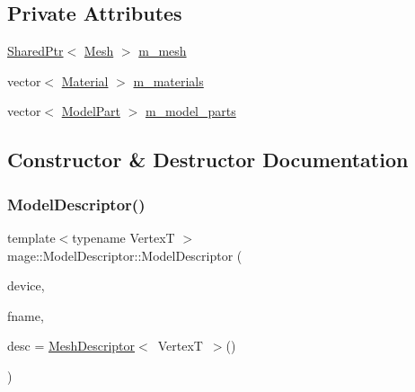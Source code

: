 \subsection*{Private Attributes}
\begin{DoxyCompactItemize}
\item 
\hyperlink{namespacemage_a1e01ae66713838a7a67d30e44c67703e}{Shared\+Ptr}$<$ \hyperlink{classmage_1_1_mesh}{Mesh} $>$ \hyperlink{classmage_1_1_model_descriptor_a89ac31356e7690007c618be387399151}{m\+\_\+mesh}
\item 
vector$<$ \hyperlink{structmage_1_1_material}{Material} $>$ \hyperlink{classmage_1_1_model_descriptor_a672238b257f99836243d84f634ffeea2}{m\+\_\+materials}
\item 
vector$<$ \hyperlink{structmage_1_1_model_part}{Model\+Part} $>$ \hyperlink{classmage_1_1_model_descriptor_a200c6e44c9b6a5bde5c8490fb93ba00f}{m\+\_\+model\+\_\+parts}
\end{DoxyCompactItemize}


\subsection{Constructor \& Destructor Documentation}
\hypertarget{classmage_1_1_model_descriptor_a954e69b6b83ed0f78f9c819c4604a98a}{}\label{classmage_1_1_model_descriptor_a954e69b6b83ed0f78f9c819c4604a98a} 
\subsubsection{\texorpdfstring{Model\+Descriptor()}{ModelDescriptor()}\hspace{0.1cm}{\footnotesize\ttfamily [1/2]}}
{\footnotesize\ttfamily template$<$typename VertexT $>$ \\
mage\+::\+Model\+Descriptor\+::\+Model\+Descriptor (\begin{DoxyParamCaption}\item[{\hyperlink{namespacemage_ae74f374780900893caa5555d1031fd79}{Com\+Ptr}$<$ I\+D3\+D11\+Device2 $>$}]{device,  }\item[{const wstring \&}]{fname,  }\item[{const \hyperlink{structmage_1_1_mesh_descriptor}{Mesh\+Descriptor}$<$ VertexT $>$ \&}]{desc = {\ttfamily \hyperlink{structmage_1_1_mesh_descriptor}{Mesh\+Descriptor}$<$~VertexT~$>$()} }\end{DoxyParamCaption})}

